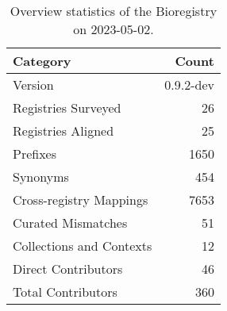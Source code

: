 \begin{table}
\caption{Overview statistics of the Bioregistry on 2023-05-02.}
\label{tab:bioregistry-summary}
\begin{tabular}{lr}
\toprule
Category & Count \\
\midrule
Version & 0.9.2-dev \\
Registries Surveyed & 26 \\
Registries Aligned & 25 \\
Prefixes & 1650 \\
Synonyms & 454 \\
Cross-registry Mappings & 7653 \\
Curated Mismatches & 51 \\
Collections and Contexts & 12 \\
Direct Contributors & 46 \\
Total Contributors & 360 \\
\bottomrule
\end{tabular}
\end{table}
